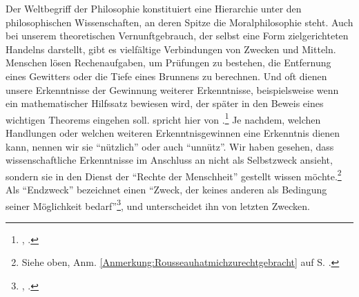 Der Weltbegriff der Philosophie konstituiert eine Hierarchie unter den
philosophischen Wissenschaften, an deren Spitze die Moralphilosophie steht.
Auch bei unserem theoretischen Vernunftgebrauch, der selbst eine Form
zielgerichteten Handelns darstellt, gibt es vielfältige Verbindungen von Zwecken
und Mitteln. Menschen lösen Rechenaufgaben, um Prüfungen zu bestehen, die
Entfernung eines Gewitters oder die Tiefe eines Brunnens zu berechnen. Und oft
dienen unsere Erkenntnisse der Gewinnung weiterer Erkenntnisse, beispielsweise
wenn ein mathematischer Hilfssatz bewiesen wird, der später in den Beweis eines
wichtigen Theorems eingehen soll.  spricht hier von
.\footnote{\cite[Vgl.][\S~62]{Kant:KritikderUrteilskraft2009},
\cite[V: 362.6--364.2]{Kant:GesammelteWerke1900ff.}.} Je nachdem, welchen
Handlungen oder welchen weiteren Erkenntnisgewinnen eine Erkenntnis dienen kann,
nennen wir sie \enquote{nützlich} oder auch \enquote{unnütz}. Wir haben gesehen,
dass  wissenschaftliche Erkenntnisse im Anschluss an
 nicht als Selbstzweck ansieht, sondern sie in den
Dienst der \enquote{Rechte der Menschheit} gestellt wissen
möchte.\footnote{Siehe oben, Anm.
\ref{Anmerkung:Rousseauhatmichzurechtgebracht} auf S.
\pageref{Anmerkung:Rousseauhatmichzurechtgebracht}.} Als \enquote{Endzweck}
bezeichnet  einen \enquote{Zweck, der keines anderen als
Bedingung seiner Möglichkeit
bedarf}\footnote{\cite[\S~84]{Kant:KritikderUrteilskraft2009}, \cite[V:
434.7--8]{Kant:GesammelteWerke1900ff.}.}, und unterscheidet ihn von letzten Zwecken.

